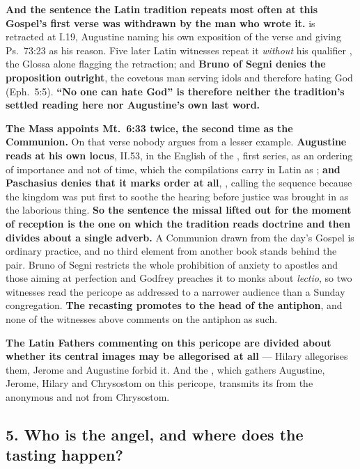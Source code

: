 \textbf{And the sentence the Latin tradition repeats most often at this Gospel's
first verse was withdrawn by the man who wrote it.}  is retracted at  I.19,
Augustine naming his own exposition of the verse and giving Ps.\ 73:23 as his
reason. Five later Latin witnesses repeat it \emph{without} his qualifier
, the Glossa alone flagging the retraction; and \textbf{Bruno of
Segni denies the proposition outright}, the covetous man serving idols and
therefore hating God (Eph.\ 5:5). \textbf{``No one can hate God'' is therefore
neither the tradition's settled reading here nor Augustine's own last word.}

\textbf{The Mass appoints Mt.\ 6:33 twice, the second time as the
Communion.} On that verse nobody argues from a lesser example.
\textbf{Augustine reads  at his own locus},  II.53, in the English of the , first series, as an ordering of
importance and not of time, which the compilations carry in Latin as
; \textbf{and
Paschasius denies that it marks order at all}, , calling the sequence  because the kingdom
was put first to soothe the hearing before justice was brought in as the
laborious thing. \textbf{So the sentence the missal lifted out for the moment of
reception is the one on which the tradition reads doctrine and then divides
about a single adverb.} A Communion drawn from the day's Gospel is ordinary
practice, and no third element from another book stands behind the pair. Bruno of Segni restricts
the whole prohibition of anxiety to apostles and those aiming at perfection and
Godfrey preaches it to monks about \emph{lectio}, so two witnesses read the
pericope as addressed to a narrower audience than a Sunday congregation. \textbf{The recasting promotes  to the
head of the antiphon}, and none of the witnesses above comments on the
antiphon as such.

\textbf{The Latin Fathers commenting on this pericope are divided about whether
its central images may be allegorised at all} --- Hilary allegorises them,
Jerome and Augustine forbid it. And the , which gathers
Augustine, Jerome, Hilary and Chrysostom on this pericope, transmits its
 from the anonymous  and
not from Chrysostom.

\subsection*{5. Who is the angel, and where does the tasting happen?}


